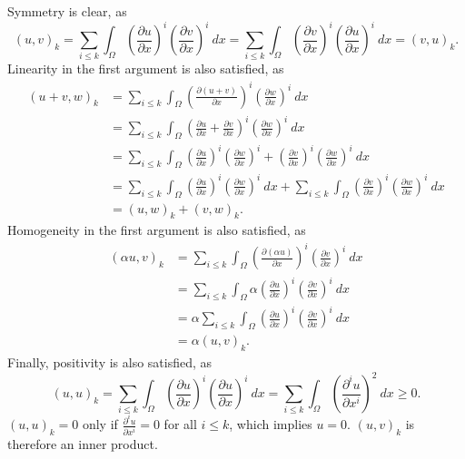 \begin{solution}
    Symmetry is clear, as
    \begin{equation*}
        (u, v)_k
        = \sum_{i \leq k} \int_{\Omega} \left( \frac{\partial u}{\partial x} \right)^i \left( \frac{\partial v}{\partial x} \right)^i \ dx
        = \sum_{i \leq k} \int_{\Omega} \left( \frac{\partial v}{\partial x} \right)^i \left( \frac{\partial u}{\partial x} \right)^i \ dx
        = (v, u)_k.
    \end{equation*}
    Linearity in the first argument is also satisfied, as
    \begin{align*}
        (u + v, w)_k
        &= \sum_{i \leq k} \int_{\Omega} \left( \frac{\partial (u + v)}{\partial x} \right)^i \left( \frac{\partial w}{\partial x} \right)^i \ dx \\
        &= \sum_{i \leq k} \int_{\Omega} \left( \frac{\partial u}{\partial x} + \frac{\partial v}{\partial x} \right)^i \left( \frac{\partial w}{\partial x} \right)^i \ dx \\
        &= \sum_{i \leq k} \int_{\Omega} \left( \frac{\partial u}{\partial x} \right)^i \left( \frac{\partial w}{\partial x} \right)^i + \left( \frac{\partial v}{\partial x} \right)^i \left( \frac{\partial w}{\partial x} \right)^i \ dx \\
        &= \sum_{i \leq k} \int_{\Omega} \left( \frac{\partial u}{\partial x} \right)^i \left( \frac{\partial w}{\partial x} \right)^i \ dx + \sum_{i \leq k} \int_{\Omega} \left( \frac{\partial v}{\partial x} \right)^i \left( \frac{\partial w}{\partial x} \right)^i \ dx \\
        &= (u, w)_k + (v, w)_k.
    \end{align*}
    Homogeneity in the first argument is also satisfied, as
    \begin{align*}
        (\alpha u, v)_k
        &= \sum_{i \leq k} \int_{\Omega} \left( \frac{\partial (\alpha u)}{\partial x} \right)^i \left( \frac{\partial v}{\partial x} \right)^i \ dx \\
        &= \sum_{i \leq k} \int_{\Omega} \alpha \left( \frac{\partial u}{\partial x} \right)^i \left( \frac{\partial v}{\partial x} \right)^i \ dx \\
        &= \alpha \sum_{i \leq k} \int_{\Omega} \left( \frac{\partial u}{\partial x} \right)^i \left( \frac{\partial v}{\partial x} \right)^i \ dx \\
        &= \alpha (u, v)_k.
    \end{align*}
    Finally, positivity is also satisfied, as
    \begin{equation*}
        (u, u)_k
        = \sum_{i \leq k} \int_{\Omega} \left( \frac{\partial u}{\partial x} \right)^i \left( \frac{\partial u}{\partial x} \right)^i \ dx
        = \sum_{i \leq k} \int_{\Omega} \left( \frac{\partial^i u}{\partial x^i} \right)^{2} \ dx
        \geq 0.
    \end{equation*}
    $(u, u)_k = 0$ only if $\frac{\partial^i u}{\partial x^i} = 0$ for all $i \leq k$, which implies $u = 0$.
    $(u, v)_k$ is therefore an inner product.
\end{solution}